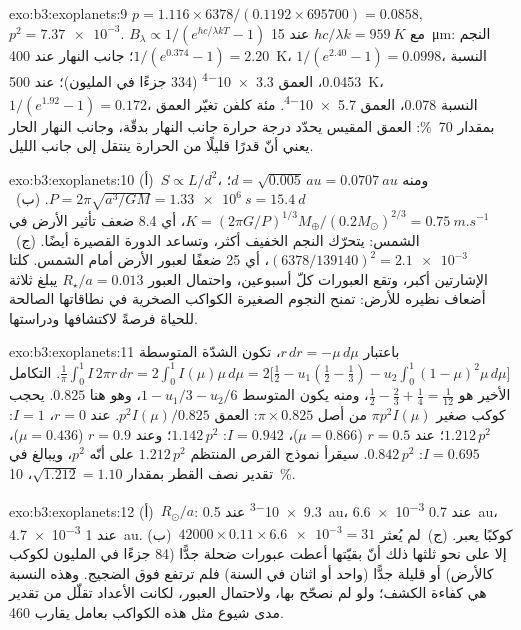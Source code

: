 \begin{solution}{exo:b3:exoplanets:9}
$p = 1.116\times6378/(0.1192\times695700) = 0.0858$, $p^2 = \num{7.37e-3}$.
$B_\lambda \propto 1/(e^{hc/\lambda kT} - 1)$ مع $hc/\lambda k =
\qty{959}{K}$ عند \qty{15}{\micro m}: النجم $1/(e^{0.374} - 1) = 2.20$؛
جانب النهار عند \qty{400}{K}، $1/(e^{2.40} - 1) = 0.0998$، النسبة \num{0.0453}،
العمق \num{3.3e-4} (334 جزءًا في المليون)؛ عند \qty{500}{K}، $1/(e^{1.92} -
1) = 0.172$، النسبة \num{0.078}، العمق \num{5.7e-4}. مئة كلفن
تغيّر العمق بمقدار \qty{70}{\percent}: العمق المقيس يحدّد درجة حرارة
جانب النهار بدقّة، وجانب النهار الحار يعني أنّ
قدرًا قليلًا من الحرارة ينتقل إلى جانب الليل.
\end{solution}

\begin{solution}{exo:b3:exoplanets:10}
(أ)~$S \propto L/d^2$، ومنه $d = \sqrt{0.005}\,\unit{au} = \qty{0.0707}{au}$؛
$P = 2\pi\sqrt{a^3/GM} = \qty{1.33e6}{s} = \qty{15.4}{d}$.
(ب)~$K = (2\pi G/P)^{1/3}M_\oplus/(0.2M_\odot)^{2/3} = \qty{0.75}{m.s^{-1}}$،
أي 8.4 ضعف تأثير الأرض في الشمس: يتحرّك النجم الخفيف أكثر،
وتساعد الدورة القصيرة أيضًا. (ج)~$(6378/139140)^2 = \num{2.1e-3}$، أي 25 ضعفًا
لعبور الأرض أمام الشمس. كلتا الإشارتين أكبر، وتقع العبورات
كلّ أسبوعين، واحتمال العبور $R_\star/a =
\num{0.013}$ يبلغ ثلاثة أضعاف نظيره للأرض: تمنح النجوم الصغيرة الكواكب الصخرية في
نطاقاتها الصالحة للحياة فرصةً لاكتشافها ودراستها.
\end{solution}

\begin{solution}{exo:b3:exoplanets:11}
باعتبار $r\,dr = -\mu\,d\mu$، تكون الشدّة المتوسطة $\frac1\pi\int_0^1
I\,2\pi r\,dr = 2\int_0^1 I(\mu)\mu\,d\mu = 2\bigl[\tfrac12 - u_1(\tfrac12 -
\tfrac13) - u_2\int_0^1(1 - \mu)^2\mu\,d\mu\bigr]$. التكامل الأخير هو
$\tfrac12 - \tfrac23 + \tfrac14 = \tfrac1{12}$، ومنه يكون المتوسط $1 - u_1/3 -
u_2/6$، وهو هنا $0.825$. يحجب كوكب صغير $\pi p^2 I(\mu)$ من أصل $\pi\times
0.825$: العمق $p^2 I(\mu)/0.825$. عند $r = 0$، $I = 1$: $1.212\,p^2$؛ عند
$r = 0.5$ ($\mu = 0.866$)، $I = 0.942$: $1.142\,p^2$؛ وعند $r = 0.9$ ($\mu =
0.436$)، $I = 0.695$: $0.842\,p^2$. سيقرأ نموذج القرص المنتظم
$1.212\,p^2$ على أنّه $p^2$، ويبالغ في تقدير نصف القطر بمقدار $\sqrt{1.212} = 1.10$،
\qty{10}{\percent}.
\end{solution}

\begin{solution}{exo:b3:exoplanets:12}
(أ)~$R_\odot/a$: \num{9.3e-3} عند \qty{0.5}{au}، \num{6.6e-3} عند
\qty{0.7}{au}، \num{4.7e-3} عند \qty{1}{au}. (ب)~$42000\times0.11\times
\num{6.6e-3} = 31$ كوكبًا يعبر. (ج)~لم يُعثر إلا على نحو ثلثها
ذلك أنّ بقيّتها أعطت عبورات ضحلة جدًّا (84 جزءًا في المليون
لكوكب كالأرض) أو قليلة جدًّا (واحد أو اثنان في السنة) فلم ترتفع فوق الضجيج. وهذه
النسبة هي كفاءة الكشف؛ ولو لم نصحّح بها، ولاحتمال العبور،
لكانت الأعداد تقلّل من تقدير مدى شيوع مثل هذه
الكواكب بعامل يقارب 460.
\end{solution}

